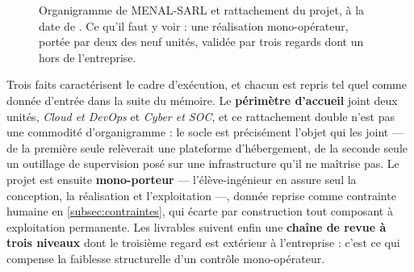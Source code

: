 \begin{figure}[!htbp]
\caption[Organigramme de MENAL-SARL et rattachement du projet]{Organigramme de MENAL-SARL et
rattachement du projet, à la date de \dateref. Ce qu'il faut y voir : une réalisation
mono-opérateur, portée par deux des neuf unités, validée par trois regards dont un hors de
l'entreprise.}
\label{fig:organisation-menal}
\end{figure}

Trois faits caractérisent le cadre d'exécution, et chacun est repris tel quel comme donnée
d'entrée dans la suite du mémoire. Le \textbf{périmètre d'accueil} joint deux unités,
\emph{Cloud et DevOps} et \emph{Cyber et SOC}, et ce rattachement double n'est pas une commodité
d'organigramme : le socle est précisément l'objet qui les joint --- de la première seule
relèverait une plateforme d'hébergement, de la seconde seule un outillage de supervision posé sur
une infrastructure qu'il ne maîtrise pas. Le projet est ensuite \textbf{mono-porteur} ---
l'élève-ingénieur en assure seul la conception, la réalisation et l'exploitation ---, donnée
reprise comme contrainte humaine en \cref{subsec:contraintes}, qui écarte par construction tout
composant à exploitation permanente. Les livrables suivent enfin une \textbf{chaîne de revue à
trois niveaux} dont le troisième regard est extérieur à l'entreprise : c'est ce qui compense la
faiblesse structurelle d'un contrôle mono-opérateur.

